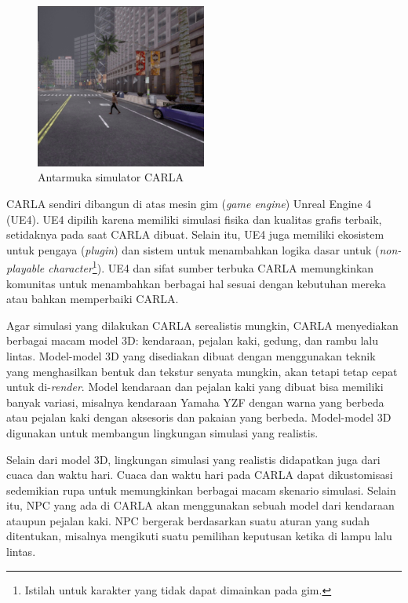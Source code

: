 \begin{figure}
    \centering
    \includegraphics[width=0.5\textwidth]{resources/chapter-2/CARLA-cropped.png}
    \caption{Antarmuka simulator CARLA}
\end{figure}

CARLA sendiri dibangun di atas mesin gim (\textit{game engine}) Unreal Engine 4
(UE4). UE4 dipilih karena memiliki simulasi fisika dan kualitas grafis terbaik,
setidaknya pada saat CARLA dibuat. Selain itu, UE4 juga memiliki ekosistem untuk
pengaya (\textit{plugin}) dan sistem untuk menambahkan logika dasar untuk
(\textit{non-playable character}\footnote{Istilah untuk karakter yang tidak
    dapat dimainkan pada gim.}). UE4 dan sifat sumber terbuka CARLA memungkinkan
komunitas untuk menambahkan berbagai hal sesuai dengan kebutuhan mereka atau
bahkan memperbaiki CARLA.

Agar simulasi yang dilakukan CARLA serealistis mungkin, CARLA menyediakan
berbagai macam model 3D: kendaraan, pejalan kaki, gedung, dan rambu lalu lintas.
Model-model 3D yang disediakan dibuat dengan menggunakan teknik yang
menghasilkan bentuk dan tekstur senyata mungkin, akan tetapi tetap cepat untuk
di-\textit{render}. Model kendaraan dan pejalan kaki yang dibuat bisa memiliki
banyak variasi, misalnya kendaraan Yamaha YZF dengan warna yang berbeda atau
pejalan kaki dengan aksesoris dan pakaian yang berbeda. Model-model 3D
digunakan untuk membangun lingkungan simulasi yang realistis.

Selain dari model 3D, lingkungan simulasi yang realistis didapatkan juga dari
cuaca dan waktu hari. Cuaca dan waktu hari pada CARLA dapat dikustomisasi
se\-de\-mi\-ki\-an rupa untuk memungkinkan berbagai macam skenario simulasi.
Selain itu, NPC yang ada di CARLA akan menggunakan sebuah model dari kendaraan
ataupun pejalan kaki. NPC bergerak berdasarkan suatu aturan yang sudah
ditentukan, misalnya mengikuti suatu pemilihan keputusan ketika di lampu lalu
lintas.

